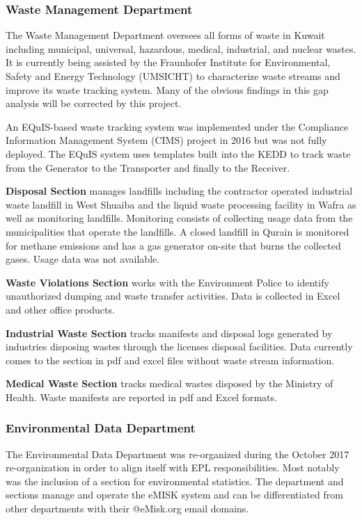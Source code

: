 \subsubsection{Waste Management Department}
The Waste Management Department oversees all forms of waste in Kuwait including municipal, universal, hazardous, medical, industrial, and nuclear wastes. It is currently being assisted by the  Fraunhofer Institute for Environmental, Safety and Energy Technology (UMSICHT) to characterize waste streams and improve its waste tracking system. Many of the obvious findings in this gap analysis will be corrected by this project.

An EQuIS-based waste tracking system was implemented under the Compliance Information Management System (CIMS) project in 2016 but was not fully deployed. The EQuIS system uses templates built into the KEDD to track waste from the Generator to the Transporter and finally to the Receiver.

\textbf{Disposal Section} manages landfills including the contractor operated industrial waste landfill in West Shuaiba and the liquid waste processing facility in Wafra as well as monitoring landfills. Monitoring consists of collecting usage data from the municipalities that operate the landfills. A closed landfill in Qurain is monitored for methane emissions and has a gas generator on-site that burns the collected gases. Usage data was not available.

\textbf{Waste Violations Section} works with the Environment Police to identify unauthorized dumping and waste transfer activities. Data is collected in Excel and other office products.

\textbf{Industrial Waste Section} tracks manifests and disposal logs generated by industries disposing wastes through the licenses disposal facilities. Data currently comes to the section in pdf and excel files without waste stream information.

\textbf{Medical Waste Section} tracks medical wastes disposed by the Ministry of Health. Waste manifests are reported in pdf and Excel formats.

\subsubsection{Environmental Data Department}
The Environmental Data Department was re-organized during the October 2017 re-organization in order to align itself with EPL responsibilities. Most notably was the inclusion of a section for environmental statistics. The department and sections manage and operate the  eMISK system and can be differentiated from other departments with their @eMisk.org email domains.  

